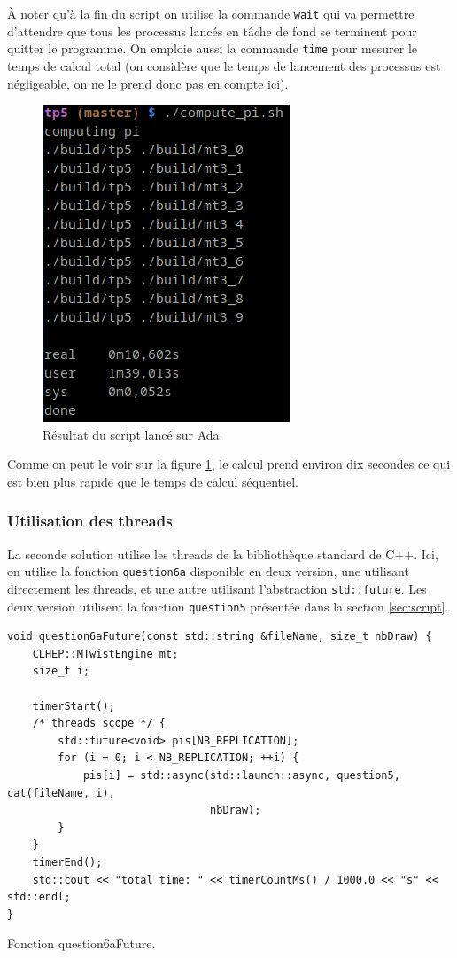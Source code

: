 \documentclass[a4paper]{article}
\begin{document}
À noter qu'à la fin du script on utilise la commande \lstinline{wait} qui va
permettre d'attendre que tous les processus lancés en tâche de fond se terminent
pour quitter le programme. On emploie aussi la commande \lstinline{time} pour
mesurer le temps de calcul total (on considère que le temps de lancement des
processus est négligeable, on ne le prend donc pas en compte ici).\\

\begin{figure}[ht!]
  \centering
  \includegraphics[scale=0.5]{./img/pi_script.png}
  \caption{Résultat du script lancé sur Ada.}
  \label{fig:script}
\end{figure}

Comme on peut le voir sur la figure \ref{fig:script}, le calcul prend environ
dix secondes ce qui est bien plus rapide que le temps de calcul séquentiel.

\clearpage
\subsubsection{Utilisation des threads}

La seconde solution utilise les threads de la bibliothèque standard de C++. Ici,
on utilise la fonction \lstinline{question6a} disponible en deux version, une
utilisant directement les threads, et une autre utilisant l'abstraction
\lstinline{std::future}. Les deux version utilisent la fonction
\lstinline{question5} présentée dans la section \ref{sec:script}.

\begin{listing}[ht!]
\begin{verbatim}
void question6aFuture(const std::string &fileName, size_t nbDraw) {
    CLHEP::MTwistEngine mt;
    size_t i;

    timerStart();
    /* threads scope */ {
        std::future<void> pis[NB_REPLICATION];
        for (i = 0; i < NB_REPLICATION; ++i) {
            pis[i] = std::async(std::launch::async, question5, cat(fileName, i),
                                nbDraw);
        }
    }
    timerEnd();
    std::cout << "total time: " << timerCountMs() / 1000.0 << "s" << std::endl;
}
\end{verbatim}
\caption{Fonction question6aFuture.}
\label{fn-q6}
\end{listing}
\end{document}

